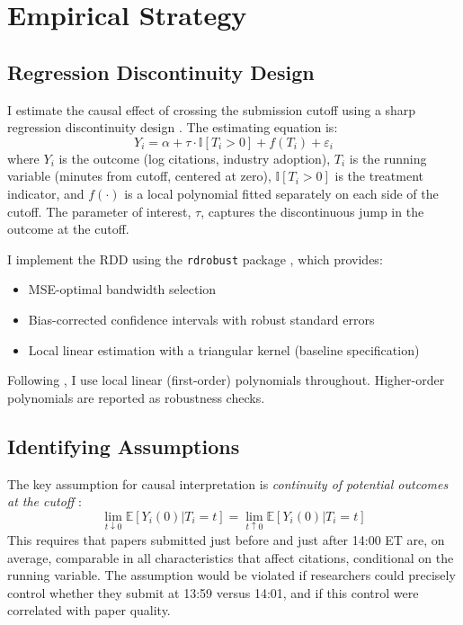 \documentclass[12pt]{article}
\newcommand{\E}{\mathbb{E}}
\newcommand{\ind}{\mathbb{I}}
\begin{document}
\section{Empirical Strategy}

\subsection{Regression Discontinuity Design}

I estimate the causal effect of crossing the submission cutoff using a sharp regression discontinuity design \citep{lee2010, cattaneo2020}. The estimating equation is:
\begin{equation}
Y_i = \alpha + \tau \cdot \ind[T_i > 0] + f(T_i) + \varepsilon_i
\label{eq:rdd}
\end{equation}
where $Y_i$ is the outcome (log citations, industry adoption), $T_i$ is the running variable (minutes from cutoff, centered at zero), $\ind[T_i > 0]$ is the treatment indicator, and $f(\cdot)$ is a local polynomial fitted separately on each side of the cutoff. The parameter of interest, $\tau$, captures the discontinuous jump in the outcome at the cutoff.

I implement the RDD using the \texttt{rdrobust} package \citep{calonico2014, calonico2020}, which provides:
\begin{itemize}
\item MSE-optimal bandwidth selection \citep{imbens2012}
\item Bias-corrected confidence intervals with robust standard errors
\item Local linear estimation with a triangular kernel (baseline specification)
\end{itemize}

Following \citet{gelman2019}, I use local linear (first-order) polynomials throughout. Higher-order polynomials are reported as robustness checks.

\subsection{Identifying Assumptions}

The key assumption for causal interpretation is \textit{continuity of potential outcomes at the cutoff} \citep{lee2010}:
\begin{equation}
\lim_{t \downarrow 0} \E[Y_i(0) | T_i = t] = \lim_{t \uparrow 0} \E[Y_i(0) | T_i = t]
\end{equation}
This requires that papers submitted just before and just after 14:00 ET are, on average, comparable in all characteristics that affect citations, conditional on the running variable. The assumption would be violated if researchers could precisely control whether they submit at 13:59 versus 14:01, and if this control were correlated with paper quality.
\end{document}

